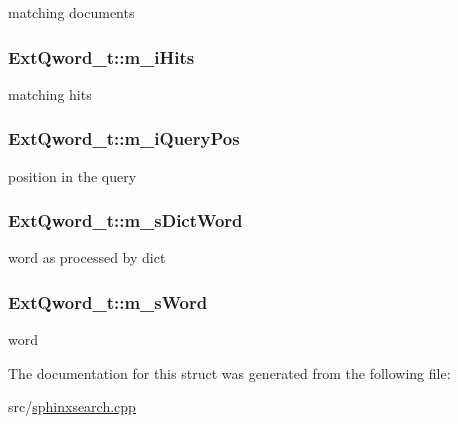 matching documents 

\hypertarget{structExtQword__t_a854cb13b14e63a708409c014e9be118c}{
\subsubsection[{m\-\_\-i\-Hits}]{ Ext\-Qword\-\_\-t\-::m\-\_\-i\-Hits}}\label{structExtQword__t_a854cb13b14e63a708409c014e9be118c}


matching hits 

\hypertarget{structExtQword__t_a0010f8fc64f4274a27acc5a630a2171d}{
\subsubsection[{m\-\_\-i\-Query\-Pos}]{ Ext\-Qword\-\_\-t\-::m\-\_\-i\-Query\-Pos}}\label{structExtQword__t_a0010f8fc64f4274a27acc5a630a2171d}


position in the query 

\hypertarget{structExtQword__t_aa3dddf8964085f87b81e90cdf827d598}{
\subsubsection[{m\-\_\-s\-Dict\-Word}]{ Ext\-Qword\-\_\-t\-::m\-\_\-s\-Dict\-Word}}\label{structExtQword__t_aa3dddf8964085f87b81e90cdf827d598}


word as processed by dict 

\hypertarget{structExtQword__t_ab1f6c98ed6a7685eeab11d915926827f}{
\subsubsection[{m\-\_\-s\-Word}]{ Ext\-Qword\-\_\-t\-::m\-\_\-s\-Word}}\label{structExtQword__t_ab1f6c98ed6a7685eeab11d915926827f}


word 



The documentation for this struct was generated from the following file\-:\begin{DoxyCompactItemize}
\item 
src/\hyperlink{sphinxsearch_8cpp}{sphinxsearch.\-cpp}\end{DoxyCompactItemize}
